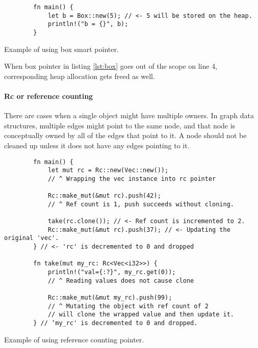 \begin{listing}[!htbp]

    \centering
    \begin{verbatim}
        fn main() {
            let b = Box::new(5); // <- 5 will be stored on the heap.
            println!("b = {}", b);
        }
    \end{verbatim}

    \caption{Example of using box smart pointer.}
    \label{lst:box}
\end{listing}

When box pointer in listing \ref{lst:box} goes out of the scope on line 4, corresponding heap allocation gets freed as well.

\paragraph{Rc or reference counting}
There are cases when a single object might have multiple owners. In graph data structures, multiple edges might point to the same node, and that node is conceptually owned by all of the edges that point to it. A node should not be cleaned up unless it does not have any edges pointing to it.

\begin{listing}[!htbp]

    \centering
    \begin{verbatim}
        fn main() {
            let mut rc = Rc::new(Vec::new());
            // ^ Wrapping the vec instance into rc pointer

            Rc::make_mut(&mut rc).push(42);
            // ^ Ref count is 1, push succeeds without cloning.

            take(rc.clone()); // <- Ref count is incremented to 2.
            Rc::make_mut(&mut rc).push(37); // <- Updating the original 'vec'.
        } // <- 'rc' is decremented to 0 and dropped

        fn take(mut my_rc: Rc<Vec<i32>>) {
            println!("val={:?}", my_rc.get(0));
            // ^ Reading values does not cause clone

            Rc::make_mut(&mut my_rc).push(99);
            // ^ Mutating the object with ref count of 2
            // will clone the wrapped value and then update it.
        } // ‘my_rc' is decremented to 0 and dropped.
    \end{verbatim}

    \caption{Example of using reference counting pointer.}
    \label{lst:rc}
\end{listing}

